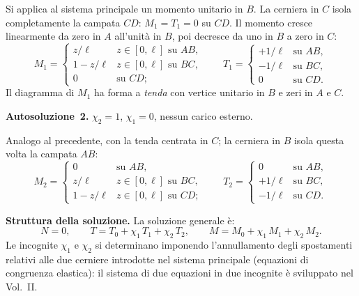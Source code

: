 Si applica al sistema principale un momento unitario
in $B$. La cerniera in $C$ isola completamente la
campata $CD$: $M_1 = T_1 = 0$ su $CD$.
Il momento cresce linearmente da zero in $A$ all'unità
in $B$, poi decresce da uno in $B$ a zero in $C$:
\[
M_1 = \begin{cases}
z/\ell & z \in [0,\ell] \text{ su } AB, \\[4pt]
1 - z/\ell & z \in [0,\ell] \text{ su } BC, \\[4pt]
0 & \text{su } CD;
\end{cases}
\qquad
T_1 = \begin{cases}
+1/\ell & \text{su } AB, \\[4pt]
-1/\ell & \text{su } BC, \\[4pt]
0 & \text{su } CD.
\end{cases}
\]
Il diagramma di $M_1$ ha forma a \emph{tenda} con vertice
unitario in $B$ e zeri in $A$ e $C$.




\medskip
\noindent\textbf{Autosoluzione~2.}
$\chi_2 = 1$, $\chi_1 = 0$, nessun carico esterno.

Analogo al precedente, con la tenda centrata in $C$;
la cerniera in $B$ isola questa volta la campata $AB$:
\[
M_2 = \begin{cases}
0 & \text{su } AB, \\[4pt]
z/\ell & z \in [0,\ell] \text{ su } BC, \\[4pt]
1 - z/\ell & z \in [0,\ell] \text{ su } CD;
\end{cases}
\qquad
T_2 = \begin{cases}
0 & \text{su } AB, \\[4pt]
+1/\ell & \text{su } BC, \\[4pt]
-1/\ell & \text{su } CD.
\end{cases}
\]

\medskip
\noindent\textbf{Struttura della soluzione.}
La soluzione generale è:
\begin{equation}
\label{eq:sovrapposizione_tc}
N = 0, \qquad
T = T_0 + \chi_1\,T_1 + \chi_2\,T_2, \qquad
M = M_0 + \chi_1\,M_1 + \chi_2\,M_2.
\end{equation}
Le incognite $\chi_1$ e $\chi_2$ si determinano imponendo
l'annullamento degli spostamenti relativi alle due cerniere
introdotte nel sistema principale (equazioni di congruenza
elastica): il sistema di due equazioni in due incognite
è sviluppato nel Vol.~II.

